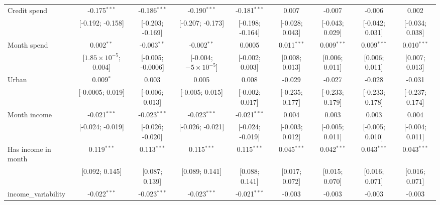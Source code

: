 \begin{table}[htbp]
\begin{threeparttable}[b]
\begin{tabular}{lcccccccc}
         Credit spend              & -0.175$^{***}$                 & -0.186$^{***}$    & -0.190$^{***}$                & -0.181$^{***}$   & 0.007           & -0.007           & -0.006           & 0.002\\   
                                   & [-0.192; -0.158]               & [-0.203; -0.169]  & [-0.207; -0.173]              & [-0.198; -0.164] & [-0.028; 0.043] & [-0.043; 0.029]  & [-0.042; 0.031]  & [-0.034; 0.038]\\   
         Month spend               & 0.002$^{**}$                   & -0.003$^{**}$     & -0.002$^{**}$                 & 0.0005           & 0.011$^{***}$   & 0.009$^{***}$    & 0.009$^{***}$    & 0.010$^{***}$\\   
                                   & [$1.85\times 10^{-5}$; 0.004]  & [-0.005; -0.0006] & [-0.004; $-5\times 10^{-5}$]  & [-0.002; 0.003]  & [0.008; 0.013]  & [0.006; 0.011]   & [0.006; 0.011]   & [0.007; 0.013]\\   
         Urban                     & 0.009$^{*}$                    & 0.003             & 0.005                         & 0.008            & -0.029          & -0.027           & -0.028           & -0.031\\   
                                   & [-0.0005; 0.019]               & [-0.006; 0.013]   & [-0.005; 0.015]               & [-0.002; 0.017]  & [-0.235; 0.177] & [-0.233; 0.179]  & [-0.233; 0.178]  & [-0.237; 0.174]\\   
         Month income              & -0.021$^{***}$                 & -0.023$^{***}$    & -0.023$^{***}$                & -0.021$^{***}$   & 0.004           & 0.003            & 0.003            & 0.004\\   
                                   & [-0.024; -0.019]               & [-0.026; -0.020]  & [-0.026; -0.021]              & [-0.024; -0.019] & [-0.003; 0.012] & [-0.005; 0.011]  & [-0.005; 0.010]  & [-0.004; 0.011]\\   
         Has income in month       & 0.119$^{***}$                  & 0.113$^{***}$     & 0.115$^{***}$                 & 0.115$^{***}$    & 0.045$^{***}$   & 0.042$^{***}$    & 0.043$^{***}$    & 0.043$^{***}$\\   
                                   & [0.092; 0.145]                 & [0.087; 0.139]    & [0.089; 0.141]                & [0.088; 0.141]   & [0.017; 0.072]  & [0.015; 0.070]   & [0.016; 0.071]   & [0.016; 0.071]\\   
         income\_variability       & -0.022$^{***}$                 & -0.023$^{***}$    & -0.023$^{***}$                & -0.021$^{***}$   & -0.003          & -0.003           & -0.003           & -0.003\\   

\end{tabular}
\end{threeparttable}
\end{table}
